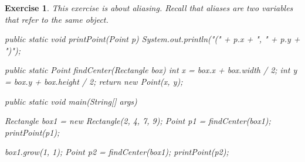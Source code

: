 \documentclass[12pt]{book}
\theoremstyle{exercise}
\newtheorem{exercise}{Exercise}[chapter]
\newcommand{\java}{\verb}%}
\begin{document}
\begin{exercise}
This exercise is about aliasing.
Recall that aliases are two variables that refer to the same object.


\begin{code}
public static void printPoint(Point p) {
    System.out.println("(" + p.x + ", " + p.y + ")");
}

public static Point findCenter(Rectangle box) {
    int x = box.x + box.width / 2;
    int y = box.y + box.height / 2;
    return new Point(x, y);
}
\end{code}

\begin{code}
public static void main(String[] args) {
    Rectangle box1 = new Rectangle(2, 4, 7, 9);
    Point p1 = findCenter(box1);
    printPoint(p1);

    box1.grow(1, 1);
    Point p2 = findCenter(box1);
    printPoint(p2);
}
\end{code}

\end{exercise}
\end{document}
